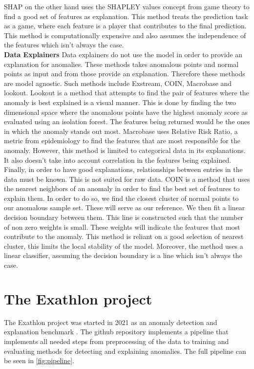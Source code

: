\documentclass[oneside, a4paper, onecolumn, 11pt]{article}
\begin{document}
SHAP on the other hand uses the SHAPLEY values concept from game theory to find a good set of features as explanation. This method treats the prediction task as a game, where each feature is a player that contributes to the final prediction. This method is computationally expensive and also assumes the independence of the features which isn't always the case.\\
\textbf{Data Explainers}
Data explainers do not use the model in order to provide an explanation for anomalies. These methods takes anomalous points and normal points as input and from those provide an explanation. Therefore these methods are model agnostic. Such methods include Exstream, COIN, Macrobase and lookout. Lookout is a method that attempts to find the pair of features where the anomaly is best explained is a visual manner. This is done by finding the two dimensional space where the anomalous points have the highest anomaly score as evaluated using an isolation forest. The features being returned would be the ones in which the anomaly stands out most. Macrobase uses Relative Risk Ratio, a metric from epidemiology to find the features that are most responsible for the anomaly. However, this method is limited to categorical data in its explanations. It also doesn't take into account correlation in the features being explained. Finally, in order to have good explanations, relationships between entries in the data must be known. This is not suited for raw data. COIN is a method that uses the nearest neighbors of an anomaly in order to find the best set of features to explain them. In order to do so, we find the closest cluster of normal points to our anomalous sample set. These will serve as our reference. We then fit a linear decision boundary between them. This line is constructed such that the number of non zero weights is small. These weights will indicate the features that most contribute to the anomaly. This method is reliant on a good selection of nearest cluster, this limits the local stability of the model. Moreover, the method uses a linear classifier, assuming the decision boundary is a line which isn't always the case.\\
\section{The Exathlon project}
The Exathlon project was started in 2021 as an anomaly detection and explanation benchmark \cite{Exathlon}. The github repository implements a pipeline that implements all needed steps from preprocessing of the data to training and evaluating methods for detecting and explaining anomalies. The full pipeline can be seen in \autoref{fig:pipeline}.
\end{document}

